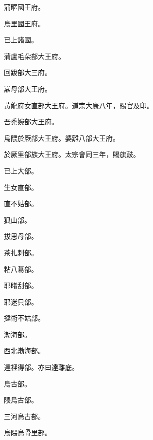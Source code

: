 \begin{pinyinscope}
 蒲暱國王府。



 烏里國王府。



 已上諸國。



 蒲盧毛朵部大王府。



 回跋部大三府。



 嵓母部大王府。



 黃龍府女直部大王府。道宗大康八年，賜官及印。



 吾禿婉部大王府。



 烏隈於厥部大王府。婆離八部大王府。



 於厥里部族大王府。太宗會同三年，賜旗鼓。



 已上大部。



 生女直部。



 直不姑部。



 狐山部。



 拔思母部。



 茶扎刺部。



 粘八葛部。



 耶睹刮部。



 耶迷只部。



 撻術不姑部。



 渤海部。



 西北渤海部。



 達裡得部。亦曰達離底。



 烏古部。



 隈烏古部。



 三河烏古部。



 烏隈烏骨里部。




\end{pinyinscope}
